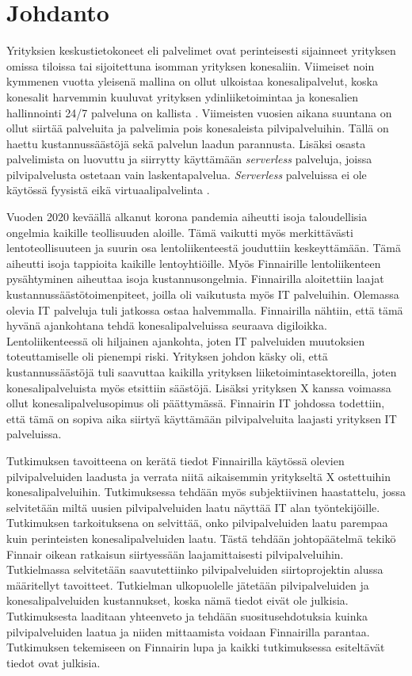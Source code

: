 \chapter{Johdanto\label{johdanto}}
Yrityksien keskustietokoneet eli palvelimet ovat perinteisesti sijainneet yrityksen omissa tiloissa tai sijoitettuna isomman yrityksen konesaliin. Viimeiset noin kymmenen vuotta yleisenä mallina on ollut ulkoistaa konesalipalvelut, koska konesalit harvemmin kuuluvat yrityksen ydinliiketoimintaa ja konesalien hallinnointi 24/7 palveluna on kallista \citep{data_center_outsourcing}. Viimeisten vuosien aikana suuntana on ollut siirtää palveluita ja palvelimia pois konesaleista pilvipalveluihin. Tällä on haettu kustannussäästöjä sekä palvelun laadun parannusta. Lisäksi osasta palvelimista on luovuttu ja siirrytty käyttämään \emph{serverless} palveluja, joissa pilvipalvelusta ostetaan vain laskentapalvelua. \emph{Serverless} palveluissa ei ole käytössä fyysistä eikä virtuaalipalvelinta \citep{serverless_computing}.


Vuoden 2020 keväällä alkanut korona pandemia aiheutti isoja taloudellisia ongelmia kaikille teollisuuden aloille. Tämä vaikutti myös merkittävästi lentoteollisuuteen ja suurin osa lentoliikenteestä jouduttiin keskeyttämään. Tämä aiheutti isoja tappioita kaikille lentoyhtiöille. Myös Finnairille lentoliikenteen pysähtyminen aiheuttaa isoja kustannusongelmia. Finnairilla aloitettiin laajat kustannussäästötoimenpiteet, joilla oli vaikutusta myös IT palveluihin. Olemassa olevia IT palveluja tuli jatkossa ostaa halvemmalla. Finnairilla nähtiin, että tämä hyvänä ajankohtana tehdä konesalipalveluissa seuraava digiloikka. Lentoliikenteessä oli hiljainen ajankohta, joten IT palveluiden muutoksien toteuttamiselle oli pienempi riski. Yrityksen johdon käsky oli, että kustannussäästöjä tuli saavuttaa kaikilla yrityksen liiketoimintasektoreilla, joten konesalipalveluista myös etsittiin säästöjä. Lisäksi yrityksen X kanssa voimassa ollut konesalipalvelusopimus oli päättymässä. Finnairin IT johdossa todettiin, että tämä on sopiva aika siirtyä käyttämään pilvipalveluita laajasti yrityksen IT palveluissa. \citep{finnair_use_ibm}

Tutkimuksen tavoitteena on kerätä tiedot Finnairilla käytössä olevien pilvipalveluiden laadusta ja verrata niitä aikaisemmin yritykseltä X ostettuihin konesalipalveluihin. Tutkimuksessa tehdään myös subjektiivinen haastattelu, jossa selvitetään miltä uusien pilvipalveluiden laatu näyttää IT alan työntekijöille. Tutkimuksen tarkoituksena on selvittää, onko pilvipalveluiden laatu parempaa kuin perinteisten konesalipalveluiden laatu. Tästä tehdään johtopäätelmä tekikö Finnair oikean ratkaisun siirtyessään laajamittaisesti pilvipalveluihin. Tutkielmassa selvitetään saavutettiinko pilvipalveluiden siirtoprojektin alussa määritellyt tavoitteet. Tutkielman ulkopuolelle jätetään pilvipalveluiden ja konesalipalveluiden kustannukset, koska nämä tiedot eivät ole julkisia. Tutkimuksesta laaditaan yhteenveto ja tehdään suositusehdotuksia kuinka pilvipalveluiden laatua ja niiden mittaamista voidaan Finnairilla parantaa. Tutkimuksen tekemiseen on Finnairin lupa ja kaikki tutkimuksessa esiteltävät tiedot ovat julkisia.

